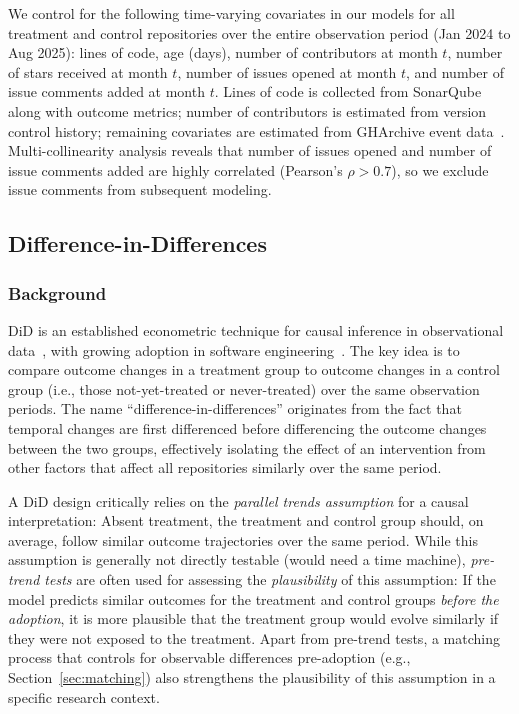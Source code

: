 We control for the following time-varying covariates in our models for all treatment and control repositories over the entire observation period (Jan 2024 to Aug 2025): lines of code, age (days), number of contributors at month $t$, number of stars received at month $t$, number of issues opened at month $t$, and number of issue comments added at month $t$. Lines of code is collected from SonarQube~\cite{sonarqube} along with outcome metrics; number of contributors is estimated from version control history; remaining covariates are estimated from GHArchive event data~\cite{gharchive}. Multi-collinearity analysis reveals that number of issues opened and number of issue comments added are highly correlated (Pearson's $\rho > 0.7$), so we exclude issue comments from subsequent modeling.

\subsection{Difference-in-Differences}
\label{sec:modeling}

\subsubsection{Background}

DiD is an established econometric technique for causal inference in observational data~\cite{card1994minimum, cunningham2021causal}, with growing adoption in software engineering~\cite{nakasai2018donation, DBLP:conf/icse/FangLHV22, casanueva2025impact}. 
The key idea is to compare outcome changes in a treatment group to outcome changes in a control group (i.e., those not-yet-treated or never-treated) over the same observation periods. 
The name ``difference-in-differences'' originates from the fact that temporal changes are first differenced before differencing the outcome changes between the two groups, effectively isolating the effect of an intervention from other factors that affect all repositories similarly over the same period.

A DiD design critically relies on the \textit{parallel trends assumption} for a causal interpretation: Absent treatment, the treatment and control group should, on average, follow similar outcome trajectories over the same period. 
While this assumption is generally not directly testable (would need a time machine), \emph{pre-trend tests} are often used for assessing the \emph{plausibility} of this assumption: If the model predicts similar outcomes for the treatment and control groups \emph{before the adoption}, it is more plausible that the treatment group would evolve similarly if they were not exposed to the treatment.
Apart from pre-trend tests, a matching process that controls for observable differences pre-adoption (e.g., Section~\ref{sec:matching}) also strengthens the plausibility of this assumption in a specific research context.

